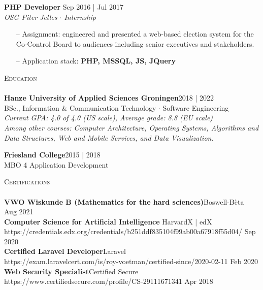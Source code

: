 \documentclass[a4paper]{article}
\newcommand{\lineunder} {
    \vspace*{-8pt} \\
    \hspace*{-18pt} \hrulefill \\
}
\newcommand{\header} [1] {
    {\hspace*{-18pt}\vspace*{6pt} \textsc{#1}}
    \vspace*{-6pt} \lineunder
}
\begin{document}
\textbf{PHP Developer} \hfill \color{gray} Sep 2016 | Jul 2017\color{black}\\
\textit{OSG Piter Jelles $\cdot$ Internship}\\
\vspace{-1mm}
\begin{itemize} \itemsep 1pt
	\item[--] Assignment: engineered and presented a web-based election system for the Co-Control Board to audiences including senior executives and stakeholders.
	\item[--] Application stack: \textbf{PHP, MSSQL, JS, JQuery}
\end{itemize}


\vspace{5mm}

\header{Education}
\vspace{2mm}
\textbf{Hanze University of Applied Sciences Groningen}\hfill \color{gray}2018 | 2022\color{black}\\
BSc., Information \& Communication Technology $\cdot$ Software Engineering\\
\vspace{1mm}
\emph{Current GPA: 4.0 of 4.0 (US scale), Average grade: 8.8 (EU scale)}\\
\vspace{1mm}
\color{gray}\emph{Among other courses: Computer Architecture, Operating Systems, Algorithms and Data Structures, Web and Mobile Services, and Data Visualization.}\color{black}

\vspace{3mm}
\textbf{Friesland College}\hfill \color{gray}2015 | 2018\color{black}\\
MBO 4 Application Development\\

\newpage

\header{Certifications}
\textbf{VWO Wiskunde B (Mathematics for the hard sciences)}\hfill Boswell-Bèta\\
 \hfill \color{gray}Aug 2021\color{black}\\
\vspace{2mm}
\textbf{Computer Science for Artificial Intelligence }\hfill HarvardX | edX\\
\color{gray}https://credentials.edx.org/credentials/b251ddf835104f99ab00a67918f55d04/\color{black} \hfill \color{gray}Sep 2020\color{black}\\
\vspace{2mm}
\textbf{Certified Laravel Developer}\hfill Laravel\\
\color{gray}https://exam.laravelcert.com/is/roy-voetman/certified-since/2020-02-11\color{black} \hfill \color{gray}Feb 2020\color{black}\\
\vspace{2mm}
\textbf{Web Security Specialist}\hfill Certified Secure\\
\color{gray}https://www.certifiedsecure.com/profile/CS-29111671341\color{black} \hfill \color{gray}Apr 2018\color{black}\\
\vspace{2mm}
\end{document}
